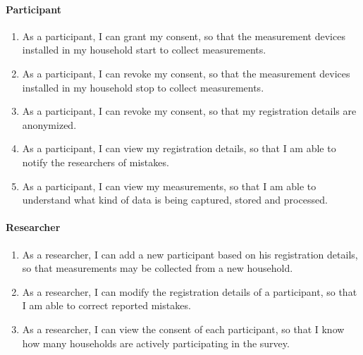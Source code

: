 \paragraph{Participant}
\begin{enumerate}[font=\sffamily,label={\textbf{FR-\protect\twodigits{\theenumi}}},leftmargin=1.4cm, ref=FR-\protect\twodigits{\theenumi}]
	\item As a participant, I can grant my consent, so that the measurement devices installed in my household start to collect measurements.\label{itm:fr-grant-consent}
	\item As a participant, I can revoke my consent, so that the measurement devices installed in my household stop to collect measurements.\label{itm:fr-revoke-consent}
	\item As a participant, I can revoke my consent, so that my registration details are anonymized.\label{itm:fr-revoke-consent-anonymize}
	\item As a participant, I can view my registration details, so that I am able to notify the researchers of mistakes.\label{itm:fr-view-registration-details}
	\item As a participant, I can view my measurements, so that I am able to understand what kind of data is being captured, stored and processed.\label{itm:fr-view-measurements}
\end{enumerate}

\paragraph{Researcher}
\begin{enumerate}[resume, font=\sffamily,label={\textbf{FR-\protect\twodigits{\theenumi}}},leftmargin=1.4cm, ref=FR-\protect\twodigits{\theenumi}]
	\item As a researcher, I can add a new participant based on his registration details, so that measurements may be collected from a new household.\label{itm:fr-add-participant}
	\item As a researcher, I can modify the registration details of a participant, so that I am able to correct reported mistakes.\label{itm:fr-modify-registration-details}
	\item As a researcher, I can view the consent of each participant, so that I know how many households are actively participating in the survey.\label{itm:fr-view-consent}
\end{enumerate}

